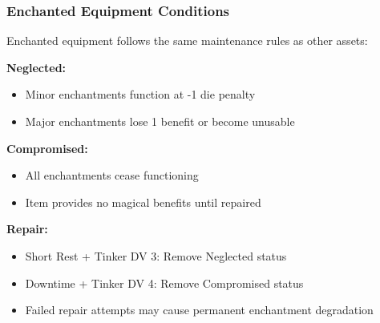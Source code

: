 \subsubsection{Enchanted Equipment Conditions}

Enchanted equipment follows the same maintenance rules as other assets:

\textbf{Neglected:}
\begin{itemize}
\item Minor enchantments function at -1 die penalty
\item Major enchantments lose 1 benefit or become unusable
\end{itemize}

\textbf{Compromised:}
\begin{itemize}
\item All enchantments cease functioning
\item Item provides no magical benefits until repaired
\end{itemize}

\textbf{Repair:}
\begin{itemize}
\item Short Rest + Tinker DV 3: Remove Neglected status
\item Downtime + Tinker DV 4: Remove Compromised status
\item Failed repair attempts may cause permanent enchantment degradation
\end{itemize}

